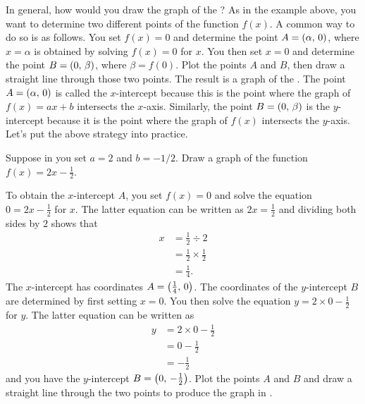 \documentclass[a4paper,oneside,12pt]{article}
\begin{document}
In general, how would you draw the graph of the
?  As in the example above, you
want to determine two different points of the function $f(x)$.  A
common way to do so is as follows.  You set $f(x) = 0$ and determine
the point $A = \left\lparen{\alpha},\, {0}\right\rparen$, where $x = \alpha$ is obtained by
solving $f(x) = 0$ for $x$.  You then set $x = 0$ and determine the
point $B = \left\lparen{0},\, {\beta}\right\rparen$, where $\beta = f(0)$.  Plot the points
$A$ and $B$, then draw a straight line through those two points.  The
result is a graph of the .  The
point $A = \left\lparen{\alpha},\, {0}\right\rparen$ is called the $x$-intercept because this
is the point where the graph of $f(x) = ax + b$ intersects the
$x$-axis.  Similarly, the point $B = \left\lparen{0},\, {\beta}\right\rparen$ is the
$y$-intercept because it is the point where the graph of $f(x)$
intersects the $y$-axis.  Let's put the above strategy into practice.

\begin{example}
Suppose in  you set $a = 2$ and
$b = -1 / 2$.  Draw a graph of the function
$f(x) = 2x - \frac{1}{2}$.
\end{example}

\begin{solution}
To obtain the $x$-intercept $A$, you set $f(x) = 0$ and solve the
equation $0 = 2x - \frac{1}{2}$ for $x$.  The latter equation can be
written as $2x = \frac{1}{2}$ and dividing both sides by $2$ shows
that
\begin{align*}
x
&=
\frac{1}{2} \div 2 \\[4pt]
&=
\frac{1}{2} \times \frac{1}{2} \\[4pt]
&=
\frac{1}{4}.
\end{align*}
The $x$-intercept has coordinates $A = \left\lparen{\frac{1}{4}},\, {0}\right\rparen$.  The
coordinates of the $y$-intercept $B$ are determined by first setting
$x = 0$.  You then solve the equation $y = 2 \times 0 - \frac{1}{2}$
for $y$.  The latter equation can be written as
\begin{align*}
y
&=
2 \times 0 - \frac{1}{2} \\[4pt]
&=
0 - \frac{1}{2} \\[4pt]
&=
-\frac{1}{2}
\end{align*}
and you have the $y$-intercept $B = \left\lparen{0},\, {-\frac{1}{2}}\right\rparen$.  Plot
the points $A$ and $B$ and draw a straight line through the two points
to produce the graph in .
\end{solution}
\end{document}
